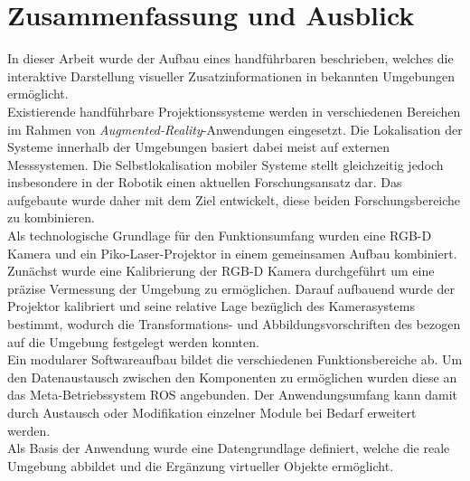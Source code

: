 \chapter{Zusammenfassung und Ausblick}
\label{chap.zusammenfassung}

%
In dieser Arbeit wurde der Aufbau eines handführbaren \kps{} beschrieben, welches die interaktive Darstellung visueller Zusatzinformationen in bekannten Umgebungen ermöglicht.\\
Existierende handführbare Projektionssysteme werden in verschiedenen Bereichen im Rahmen von \textit{Augmented-Reality}-Anwendungen eingesetzt. Die Lokalisation der Systeme innerhalb der Umgebungen basiert dabei meist auf externen Messsystemen. Die Selbstlokalisation mobiler Systeme stellt gleichzeitig jedoch insbesondere in der Robotik einen aktuellen Forschungsansatz dar. Das aufgebaute \kps{} wurde daher mit dem Ziel entwickelt, diese beiden Forschungsbereiche zu kombinieren.\\

Als technologische Grundlage für den Funktionsumfang wurden eine RGB-D Kamera und ein Piko-Laser-Projektor in einem gemeinsamen Aufbau kombiniert. Zunächst wurde eine Kalibrierung der RGB-D Kamera durchgeführt um eine präzise Vermessung der Umgebung zu ermöglichen. Darauf aufbauend wurde der Projektor kalibriert und seine relative Lage bezüglich des Kamerasystems bestimmt, wodurch die Transformations- und Abbildungsvorschriften des  bezogen auf die Umgebung festgelegt werden konnten.\\

Ein modularer Softwareaufbau bildet die verschiedenen Funktionsbereiche ab. Um den Datenaustausch zwischen den Komponenten zu ermöglichen wurden diese an das Meta-Betriebssystem ROS angebunden. Der Anwendungsumfang kann damit durch Austausch oder Modifikation einzelner Module bei Bedarf erweitert werden.\\
Als Basis der Anwendung wurde eine Datengrundlage definiert, welche die reale Umgebung abbildet und die Ergänzung virtueller Objekte ermöglicht. \\
 

